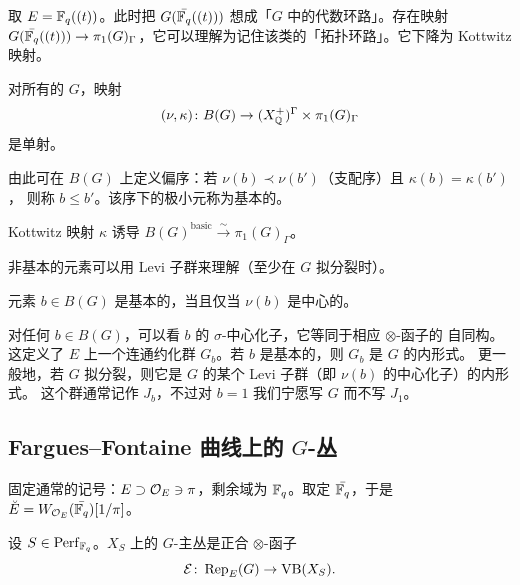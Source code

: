 \begin{example}
取 $E=\mathbb{F}_q((t))$。此时把 $G(\bar{\mathbb{F}_q}((t)))$ 想成「$G$ 中的代数环路」。存在映射
$G(\bar{\mathbb{F}_q}((t)))\to\pi_1(G)_\Gamma$，它可以理解为记住该类的「拓扑环路」。它下降为
Kottwitz 映射。
\begin{center}
\end{center}
\end{example}

\begin{theorem}[Kottwitz]
对所有的 $G$，映射
\[
(\nu,\kappa)\colon B(G)\to(X^+_{\mathbb{Q}})^\Gamma\times\pi_1(G)_\Gamma
\]
是单射。
\end{theorem}

由此可在 $B(G)$ 上定义偏序：若 $\nu(b)\prec\nu(b')$（支配序）且 $\kappa(b)=\kappa(b')$，
则称 $b\le b'$。该序下的极小元称为基本的。

\begin{proposition}
Kottwitz 映射 $\kappa$ 诱导 $B(G)^{\mathrm{basic}}\xrightarrow{\sim}\pi_1(G)_\Gamma$。
\end{proposition}

非基本的元素可以用 Levi 子群来理解（至少在 $G$ 拟分裂时）。

\begin{proposition}
元素 $b\in B(G)$ 是基本的，当且仅当 $\nu(b)$ 是中心的。
\end{proposition}

对任何 $b\in B(G)$，可以看 $b$ 的 $\sigma$-中心化子，它等同于相应 $\otimes$-函子的
自同构。这定义了 $E$ 上一个连通约化群 $G_b$。若 $b$ 是基本的，则 $G_b$ 是 $G$ 的内形式。
更一般地，若 $G$ 拟分裂，则它是 $G$ 的某个 Levi 子群（即 $\nu(b)$ 的中心化子）的内形式。
这个群通常记作 $J_b$，不过对 $b=1$ 我们宁愿写 $G$ 而不写 $J_1$。

\subsection{Fargues--Fontaine 曲线上的 $G$-丛}

固定通常的记号：$E\supset\mathcal{O}_E\ni\pi$，剩余域为 $\mathbb{F}_q$。取定 $\bar{\mathbb{F}_q}$，于是
$\breve{E}=W_{\mathcal{O}_E}(\bar{\mathbb{F}_q})[1/\pi]$。

\begin{definition}
设 $S\in\mathrm{Perf}_{\mathbb{F}_q}$。$X_S$ 上的 $G$-主丛是正合 $\otimes$-函子
\[
\mathcal{E}\colon\operatorname{Rep}_E(G)\to\mathrm{VB}(X_S).
\]
\end{definition}

